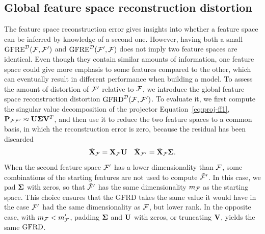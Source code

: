 \subsection{Global feature space reconstruction distortion}

The feature space reconstruction error gives insights into whether a feature space can be inferred by knowledge of a second one. However, having both a small $\operatorname{GFRE}^{\mathcal{D}}(\mathcal{F},\mathcal{F}^{\prime})$ and $\operatorname{GFRE}^{\mathcal{D}}(\mathcal{F}^{\prime},\mathcal{F})$ does not imply two feature spaces are identical. Even though they contain similar amounts of information, one feature space could give more emphasis to some features compared to the other, which can eventually result in different performance when building a model.
To assess the amount of distortion of $\mathcal{F}^{\prime}$ relative to $\mathcal{F}$, we introduce the global feature space reconstruction distortion $\operatorname{GFRD}^{\mathcal{D}}(\mathcal{F},\mathcal{F}^{\prime})$.
To evaluate it, we first compute the singular value decomposition of the projector Equation~\eqref{eq:proj-ff1}, $\mathbf{P}_{{\mathcal{F}}{\mathcal{F}^{\prime}}}\approx\mathbf{U} \boldsymbol{\Sigma} \mathbf{V}^T$, and then use it to reduce the two feature spaces to a common basis, in which the reconstruction error is zero, because the residual has been discarded
\begin{equation}
{\tilde{\mathbf{X}}}_{\mathcal{F}} = \mathbf{X}_{\mathcal{F}}\mathbf{U} \quad  {\tilde{\mathbf{X}}}_{\mathcal{F}^{\prime}} = {\tilde{\mathbf{X}}}_{\mathcal{F}} \boldsymbol{\Sigma}.
\end{equation}
When the second feature space $\mathcal{F}^{\prime}$ has a lower dimensionality than $\mathcal{F}$, some combinations of the starting features are not used to compute $\tilde{\mathcal{F}}^{\prime}$. 
In this case, we pad $\boldsymbol{\Sigma}$ with zeros, so that $\tilde{\mathcal{F}}^{\prime}$ has the same dimensionality $m_{\mathcal{F}}$ as the starting space. This choice ensures that the GFRD takes the same value it would have in the case $\mathcal{F}^{\prime}$ had the same dimensionality as $\mathcal{F}$, but lower rank. 
In the opposite case, with $m_{\mathcal{F}}<m_{\mathcal{F}}^{\prime}$, padding $\boldsymbol{\Sigma}$ and $\mathbf{U}$ with zeros, or truncating $\mathbf{V}$, yields the same $\operatorname{GFRD}$.


